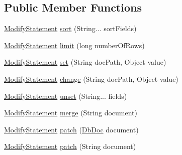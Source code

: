 \subsection*{Public Member Functions}
\begin{DoxyCompactItemize}
\item 
\mbox{\hyperlink{interfacecom_1_1mysql_1_1cj_1_1xdevapi_1_1_modify_statement}{Modify\+Statement}} \mbox{\hyperlink{interfacecom_1_1mysql_1_1cj_1_1xdevapi_1_1_modify_statement_a55eabda9b2689157d35a7c56fcce51fe}{sort}} (String... sort\+Fields)
\item 
\mbox{\hyperlink{interfacecom_1_1mysql_1_1cj_1_1xdevapi_1_1_modify_statement}{Modify\+Statement}} \mbox{\hyperlink{interfacecom_1_1mysql_1_1cj_1_1xdevapi_1_1_modify_statement_a06d66de8b558408213f7efe0e84b55c0}{limit}} (long number\+Of\+Rows)
\item 
\mbox{\hyperlink{interfacecom_1_1mysql_1_1cj_1_1xdevapi_1_1_modify_statement}{Modify\+Statement}} \mbox{\hyperlink{interfacecom_1_1mysql_1_1cj_1_1xdevapi_1_1_modify_statement_a224c3d0f2d2218a7d20ecb35ab48bccb}{set}} (String doc\+Path, Object value)
\item 
\mbox{\hyperlink{interfacecom_1_1mysql_1_1cj_1_1xdevapi_1_1_modify_statement}{Modify\+Statement}} \mbox{\hyperlink{interfacecom_1_1mysql_1_1cj_1_1xdevapi_1_1_modify_statement_acb3745c970e50cf538e8d9b2295a08e1}{change}} (String doc\+Path, Object value)
\item 
\mbox{\hyperlink{interfacecom_1_1mysql_1_1cj_1_1xdevapi_1_1_modify_statement}{Modify\+Statement}} \mbox{\hyperlink{interfacecom_1_1mysql_1_1cj_1_1xdevapi_1_1_modify_statement_a32c8da3dfdab70bf211d44db0c2f7ca2}{unset}} (String... fields)
\item 
\mbox{\hyperlink{interfacecom_1_1mysql_1_1cj_1_1xdevapi_1_1_modify_statement}{Modify\+Statement}} \mbox{\hyperlink{interfacecom_1_1mysql_1_1cj_1_1xdevapi_1_1_modify_statement_a479a30f18124563becbdb944587a35a1}{merge}} (String document)
\item 
\mbox{\hyperlink{interfacecom_1_1mysql_1_1cj_1_1xdevapi_1_1_modify_statement}{Modify\+Statement}} \mbox{\hyperlink{interfacecom_1_1mysql_1_1cj_1_1xdevapi_1_1_modify_statement_adb4e6de8bc815f50dc9ee5241454786c}{patch}} (\mbox{\hyperlink{interfacecom_1_1mysql_1_1cj_1_1xdevapi_1_1_db_doc}{Db\+Doc}} document)
\item 
\mbox{\hyperlink{interfacecom_1_1mysql_1_1cj_1_1xdevapi_1_1_modify_statement}{Modify\+Statement}} \mbox{\hyperlink{interfacecom_1_1mysql_1_1cj_1_1xdevapi_1_1_modify_statement_afc2985a9cf8d2624c16428d2be2427b4}{patch}} (String document)

\end{DoxyCompactItemize}
